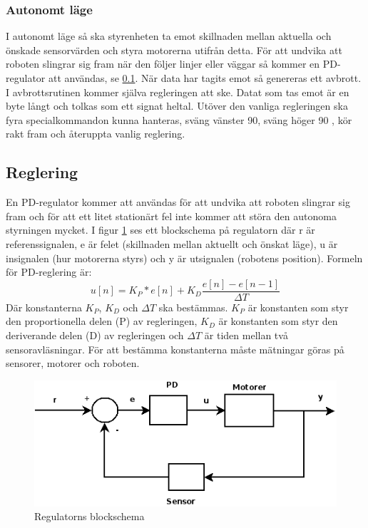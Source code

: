 \subsubsection{Autonomt läge}
I autonomt läge så ska styrenheten ta emot skillnaden mellan aktuella och önskade sensorvärden och styra motorerna utifrån detta.
För att undvika att roboten slingrar sig fram när den följer linjer eller väggar så kommer en PD-regulator att användas, se \ref{reglering}.
När data har tagits emot så genereras ett avbrott. I avbrottsrutinen kommer själva regleringen att ske. Datat som tas emot är en byte långt 
och tolkas som ett signat heltal. Utöver den vanliga regleringen ska fyra specialkommandon kunna hanteras, sväng vänster 90\degree, sväng höger 90\degree
, kör rakt fram och återuppta vanlig reglering.

\subsection{Reglering}
\label{reglering}
En PD-regulator kommer att användas för att undvika att roboten slingrar sig fram och för att ett litet stationärt fel inte kommer att störa
den autonoma styrningen mycket. I figur \ref{fig:regulator} ses ett blockschema på regulatorn där r är referenssignalen,
e är felet (skillnaden mellan aktuellt och önskat läge), u är insignalen (hur motorerna styrs) och y är utsignalen (robotens position).
Formeln för PD-reglering är: $$ u[n] = K_P*e[n] + K_D\frac{e[n]-e[n-1]}{\Delta T}$$
Där konstanterna $K_P$, $K_D$ och $\Delta T$ ska bestämmas. $K_P$ är konstanten som styr den proportionella delen (P) av regleringen, 
$K_D$ är konstanten som styr den deriverande delen (D) av regleringen och $\Delta T$ är tiden mellan två sensoravläsningar. 
För att bestämma konstanterna måste mätningar göras på sensorer, motorer och roboten.

\begin{figure}[H]
        \begin{center}
                \includegraphics[scale=0.7]{bilder/regulator.png}
        \end{center}
        \caption{Regulatorns blockschema}
        \label{fig:regulator}
\end{figure}

